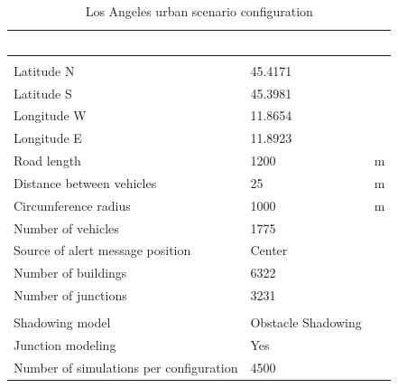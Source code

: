 		\begin{table}[H]
			\def\arraystretch{1.1}
			\begin{tabularx}{\textwidth}{l | l  l}
				\rowcolor{I} {\large \textcolor{white}{Parameter}} & {\large \textcolor{white}{Value}} & {\large \textcolor{white}{}} \TBstrut  \\
				\toprule
				\endhead
				\rowcolor{P} \multicolumn{3}{c}{Scenario configuration} \\
				\midrule[1pt]
				Latitude N								& 45.4171				& \textdegree		\\
				Latitude S								& 45.3981				& \textdegree		\\
				Longitude W								& 11.8654				& \textdegree		\\
				Longitude E								& 11.8923				& \textdegree		\\
				Road length 							& 1200	 				& m		\\
				Distance between vehicles 				& 25					& m		\\
				Circumference radius					& 1000					& m		\\
				Number of vehicles						& 1775					& 		\\
				Source of alert message position		& Center				&		\\
				Number of buildings						& 6322					&		\\
				Number of junctions						& 3231					&		\\	
				\midrule[1pt]
				\rowcolor{P} \multicolumn{3}{c}{Simulator configuration} \\
				\midrule[1pt]
				Shadowing model							& Obstacle Shadowing 	&		\\
				Junction modeling						& Yes					&		\\
				\midrule[1pt]
				Number of simulations per configuration	& 4500					&		\\
				\bottomrule
			\end{tabularx}
			\caption{Los Angeles urban scenario configuration}
			\label{tab:padua-25}
		\end{table}
	

